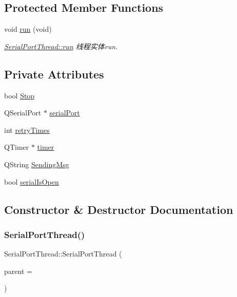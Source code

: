 \subsection*{Protected Member Functions}
\begin{DoxyCompactItemize}
\item 
void \mbox{\hyperlink{class_serial_port_thread_ab0cafe85015c88354c9c5b8f7b3f1282}{run}} (void)
\begin{DoxyCompactList}\small\item\em \mbox{\hyperlink{class_serial_port_thread_ab0cafe85015c88354c9c5b8f7b3f1282}{Serial\+Port\+Thread\+::run}} 线程实体run. \end{DoxyCompactList}\end{DoxyCompactItemize}
\subsection*{Private Attributes}
\begin{DoxyCompactItemize}
\item 
bool \mbox{\hyperlink{class_serial_port_thread_ac859512ec7787398c77158a2f63e9be0}{Stop}}
\item 
Q\+Serial\+Port $\ast$ \mbox{\hyperlink{class_serial_port_thread_a823a90c7a6917746e12265095172bfda}{serial\+Port}}
\item 
int \mbox{\hyperlink{class_serial_port_thread_aa113796646c46f083f54ef8f0190524f}{retry\+Times}}
\item 
Q\+Timer $\ast$ \mbox{\hyperlink{class_serial_port_thread_aa1f0f4cbedd58026fb8a050aa013bcfa}{timer}}
\item 
Q\+String \mbox{\hyperlink{class_serial_port_thread_a37b42e9f8f434b559c3c7fce579c4153}{Sending\+Msg}}
\item 
bool \mbox{\hyperlink{class_serial_port_thread_a913c351785f85b6c3cc90e3d6c067236}{serial\+Is\+Open}}
\end{DoxyCompactItemize}


\subsection{Constructor \& Destructor Documentation}
\mbox{\label{class_serial_port_thread_aa842675091fa3c6bb2d840bf73a246ed}} 
\subsubsection{\texorpdfstring{SerialPortThread()}{SerialPortThread()}}
{\footnotesize\ttfamily Serial\+Port\+Thread\+::\+Serial\+Port\+Thread (\begin{DoxyParamCaption}\item[{Q\+Object $\ast$}]{parent = {} }\end{DoxyParamCaption})\hspace{0.3cm}{\ttfamily [explicit]}}

